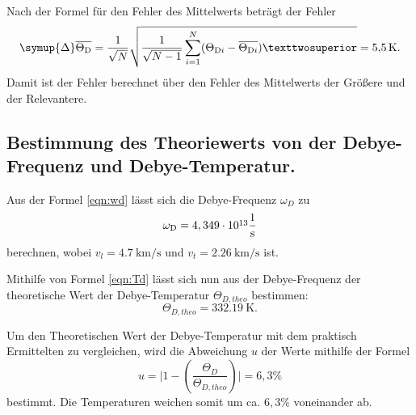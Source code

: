 Nach der Formel für den Fehler des Mittelwerts beträgt der Fehler
\begin{equation*}
  \symup{\Delta} \overline{\Theta_{\si{D}}} = \frac{1}{\sqrt{N}} \sqrt{\frac{1}{\sqrt{N-1}} \sum_{i=1}^N (\Theta_{\si{D}i}-\overline{\Theta_{\si{D}i}})²}= \SI{5,5}{\kelvin}.
\end{equation*}
Damit ist der Fehler berechnet über den Fehler des Mittelwerts der Größere und der Relevantere. 





\subsection{Bestimmung des Theoriewerts von der Debye-Frequenz und Debye-Temperatur.}

Aus der Formel \ref{eqn:wd} lässt sich die Debye-Frequenz $\omega_{\si{D}}$ zu
\begin{equation*}
    \omega_{\si{D}} = 4,349 \cdot \cramped{10^{13}} \frac{1}{\si{s}}
\end{equation*}
berechnen, wobei $v_{\si{l}}=\SI{4,7}{\kilo\metre\per\second}$ und 
$v_{\si{t}}=\SI{2,26}{\kilo\metre\per\second}$ ist.

Mithilfe von Formel \ref{eqn:Td} lässt sich nun aus der Debye-Frequenz der theoretische Wert der 
Debye-Temperatur $\Theta_{\si{D,theo}}$ bestimmen:
\begin{equation*}
    \Theta_{\si{D,theo}} = \SI{332,19}{\kelvin}.
\end{equation*}
 
Um den Theoretischen Wert der Debye-Temperatur mit dem praktisch Ermittelten zu vergleichen, wird die 
Abweichung $u$ der Werte mithilfe der Formel
\begin{equation*}
    u = \biggl| 1-\left(\frac{\Theta_{\si{D}}}{\Theta_{\si{D,theo}}}\right) \biggr| = 6,3\%
\end{equation*}
bestimmt. Die Temperaturen weichen somit um ca. $6,3$\% voneinander ab.
 
 
 
 
  
 


 



 
 
 
 
 
 

 
 




